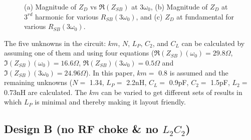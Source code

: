 \documentclass[conference]{IEEEtran}
\begin{document}
\begin{figure}[!t]
\begin{subfigure}{0.5\textwidth}
\caption{}
\label{fig:Design_A_Rn_var_1H}
\end{subfigure}
\caption{(a) Magnitude of $Z_{D}$ vs $\Re(Z_{SB})$ at $3\omega_0$, (b) Magnitude of $Z_D$ at $3^{rd}$ harmonic for various $R_{SB}(3\omega_0)$, and (c) $Z_D$ at fundamental for various $R_{SB}(3\omega_0)$.}
\label{fig:Design_A_Rn_var}
\vspace{-0.2in}
\end{figure}

The five unknowns in the circuit: $km$, $N$, $L_P$, $C_2$, and $C_L$ can be calculated by assuming one of them and using four equations ($\Re(Z_{SB})(\omega_0) =  29.8 \Omega$, $\Im(Z_{SB})(\omega_0) = 16.6\Omega$, $\Re(Z_{SB})(3\omega_0) = 0.5\Omega$ and  $\Im(Z_{SB})(3\omega_0) = 24.96\Omega$). In this paper, $km =$ 0.8 is assumed and the remaining unknowns ($N =$ 1.34, $L_P =$ 2.2nH, $C_L =$ 0.9pF, $C_2 =$ 1.5pF, $L_2 =$ 0.73nH are calculated. The $km$ can be varied to get different sets of results in which $L_P$ is minimal and thereby making it layout friendly.


\subsection{Design B (no RF choke \& no $L_2C_2$)}
\end{document}
